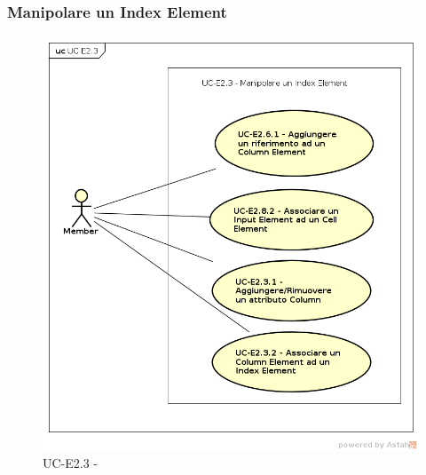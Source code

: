 \subsubsection{Manipolare un Index Element}
    \begin{figure}[H]
      \begin{center}
        \includegraphics[width=12cm]{res/img/UCEditor/UC-E2.3.png}
      \caption{UC-E2.3 - }
      \end{center} 
    \end{figure}

